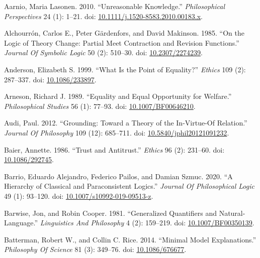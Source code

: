 \documentclass[
  10pt,
  letterpaper,
  DIV=11,
  numbers=noendperiod,
  twoside]{scrartcl}
\newlength{\cslhangindent}
\newenvironment{CSLReferences}[2] %
 {\begin{list}{}{%
  \setlength{\itemindent}{0pt}
  \setlength{\leftmargin}{0pt}
  \setlength{\parsep}{0pt}
  \ifodd #1
   \setlength{\leftmargin}{\cslhangindent}
   \setlength{\itemindent}{-1\cslhangindent}
  \fi
  \setlength{\itemsep}{#2\baselineskip}}}
 {\end{list}}
\begin{document}
\label{refs}
\begin{CSLReferences}{1}{0}
Aarnio, Maria Lasonen. 2010. {``Unreasonable Knowledge.''}
\emph{Philosophical Perspectives} 24 (1): 1--21. doi:
\href{https://doi.org/10.1111/j.1520-8583.2010.00183.x}{10.1111/j.1520-8583.2010.00183.x}.

Alchourrón, Carlos E., Peter Gärdenfors, and David Makinson. 1985. {``On
the Logic of Theory Change: Partial Meet Contraction and Revision
Functions.''} \emph{Journal Of Symbolic Logic} 50 (2): 510--30. doi:
\href{https://doi.org/10.2307/2274239}{10.2307/2274239}.

Anderson, Elizabeth S. 1999. {``What Is the Point of Equality?''}
\emph{Ethics} 109 (2): 287--337. doi:
\href{https://doi.org/10.1086/233897}{10.1086/233897}.

Arneson, Richard J. 1989. {``Equality and Equal Opportunity for
Welfare.''} \emph{Philosophical Studies} 56 (1): 77--93. doi:
\href{https://doi.org/10.1007/BF00646210}{10.1007/BF00646210}.

Audi, Paul. 2012. {``Grounding: Toward a Theory of the In-Virtue-Of
Relation.''} \emph{Journal Of Philosophy} 109 (12): 685--711. doi:
\href{https://doi.org/10.5840/jphil20121091232}{10.5840/jphil20121091232}.

Baier, Annette. 1986. {``Trust and Antitrust.''} \emph{Ethics} 96 (2):
231--60. doi: \href{https://doi.org/10.1086/292745}{10.1086/292745}.

Barrio, Eduardo Alejandro, Federico Pailos, and Damian Szmuc. 2020. {``A
Hierarchy of Classical and Paraconsistent Logics.''} \emph{Journal Of
Philosophical Logic} 49 (1): 93--120. doi:
\href{https://doi.org/10.1007/s10992-019-09513-z}{10.1007/s10992-019-09513-z}.

Barwise, Jon, and Robin Cooper. 1981. {``Generalized Quantifiers and
Natural-Language.''} \emph{Linguistics And Philosophy} 4 (2): 159--219.
doi: \href{https://doi.org/10.1007/BF00350139}{10.1007/BF00350139}.

Batterman, Robert W., and Collin C. Rice. 2014. {``Minimal Model
Explanations.''} \emph{Philosophy Of Science} 81 (3): 349--76. doi:
\href{https://doi.org/10.1086/676677}{10.1086/676677}.


\end{CSLReferences}
\end{document}
